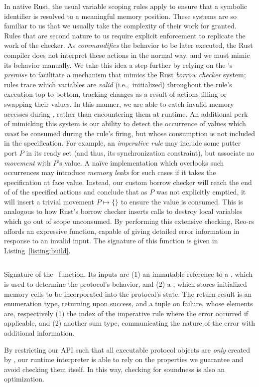 In native Rust, the usual variable scoping rules apply to ensure that a symbolic identifier is resolved to a meaningful memory position. These systems are so familiar to us that we usually take the complexity of their work for granted. Rules that are second nature to us require explicit enforcement to replicate the work of the checker. As  \textit{commandifies} the behavior to be later executed, the Rust compiler does not interpret these actions in the normal way, and we must mimic its behavior manually. We take this idea a step further by relying on the 's \textit{premise} to facilitate a mechanism that mimics the Rust \textit{borrow checker} system; rules trace which variables are \textit{valid} (i.e.,\ initialized) throughout the rule's execution top to bottom, tracking changes as a result of actions filling or swapping their values. In this manner, we are able to catch invalid memory accesses during , rather than encountering them at runtime. An additional perk of mimicking this system is our ability to detect the occurrence of values which \textit{must} be consumed during the rule's firing, but whose consumption is not included in the specification. For example, an \textit{imperative rule} may include some putter port $P$ in its ready set (and thus, its synchronization constraint), but associate no \textit{movement} with $P$'s value. A na\"ive implementation which overlooks such occurrences may introduce \textit{memory leaks} for such cases if it takes the specification at face value. Instead, our custom borrow checker will reach the end of of the specified actions and conclude that as $P$ was not explicitly emptied, it will insert a trivial movement $P\mapsto{} \{\}$ to ensure the value is consumed. This is analogous to how Rust's borrow checker inserts  calls to destroy local variables which go out of scope unconsumed. By performing this extensive checking, Reo-rs affords an expressive  function, capable of giving detailed error information in response to an invalid input. The signature of this function is given in Listing~\ref{listing:build}.


\begin{listing}[ht]
	\centering
	\inputminted[]{rust}{build.rs}
	\caption[TODO.]{Signature of the~ function. Its inputs are (1) an immutable reference to a , which is used to determine the protocol's behavior, and (2) a , which stores initialized memory cells to be incorporated into the protocol's state. The return result is an enumeration type, returning  upon success, and a tuple on failure, whose elements are, respectively (1) the index of the imperative rule where the error occurred if applicable, and (2) another sum type, communicating the nature of the error with additional information. }
	\label{listing:build}
\end{listing}

By restricting our API such that all executable protocol objects are \textit{only} created by , our runtime interpreter is able to rely on the properties we guarantee and avoid checking them itself. In this way, checking for soundness is also an optimization.

